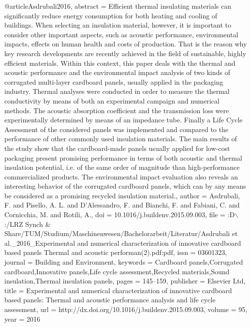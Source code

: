 \printbibliography[env=bibliographyNoReference, heading=bibintoc, title={\FTMlangLiteratureName}, category={cited}]%
\cleardoublepage%
\printbibliography[env=bibliographyNoReference, heading=bibintoc, title={\FTMlangLiteratureOwnName}, keyword={me}]

@article{Asdrubali2016,
abstract = {Efficient thermal insulating materials can significantly reduce energy consumption for both heating and cooling of buildings. When selecting an insulation material, however, it is important to consider other important aspects, such as acoustic performance, environmental impacts, effects on human health and costs of production. That is the reason why key research developments are recently achieved in the field of sustainable, highly efficient materials. Within this context, this paper deals with the thermal and acoustic performance and the environmental impact analysis of two kinds of corrugated multi-layer cardboard panels, usually applied in the packaging industry. Thermal analyses were conducted in order to measure the thermal conductivity by means of both an experimental campaign and numerical methods. The acoustic absorption coefficient and the transmission loss were experimentally determined by means of an impedance tube. Finally a Life Cycle Assessment of the considered panels was implemented and compared to the performance of other commonly used insulation materials. The main results of the study show that the cardboard-made panels usually applied for low-cost packaging present promising performance in terms of both acoustic and thermal insulation potential, i.e. of the same order of magnitude than high-performance commercialized products. The environmental impact evaluation also reveals an interesting behavior of the corrugated cardboard panels, which can by any means be considered as a promising recycled insulation material.},
author = {Asdrubali, F. and Pisello, A. L. and D'Alessandro, F. and Bianchi, F. and Fabiani, C. and Cornicchia, M. and Rotili, A.},
doi = {10.1016/j.buildenv.2015.09.003},
file = {:D$\backslash$:/LRZ Synch {\&} Share/TUM/Studium/Maschinenwesen/Bachelorarbeit/Literatur/Asdrubali et al.{\_}2016{\_}Experimental and numerical characterization of innovative cardboard based panels Thermal and acoustic performan(2).pdf:pdf},
issn = {03601323},
journal = {Building and Environment},
keywords = {Cardboard panels,Corrugated cardboard,Innovative panels,Life cycle assessment,Recycled materials,Sound insulation,Thermal insulation panels},
pages = {145--159},
publisher = {Elsevier Ltd},
title = {{Experimental and numerical characterization of innovative cardboard based panels: Thermal and acoustic performance analysis and life cycle assessment}},
url = {http://dx.doi.org/10.1016/j.buildenv.2015.09.003},
volume = {95},
year = {2016}
}